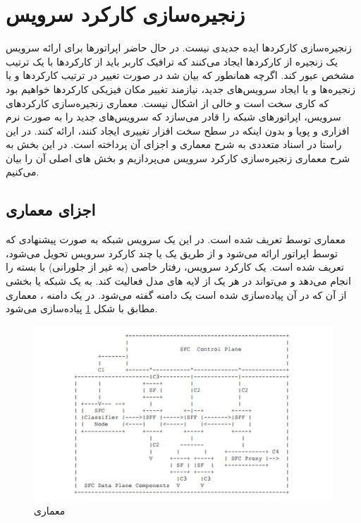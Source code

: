 \section{زنجیره‌سازی کارکرد سرویس}

زنجیره‌سازی کارکردها ایده جدیدی نیست.
در حال حاضر اپراتورها برای ارائه سرویس یک زنجیره از کارکردها ایجاد می‌کنند که ترافیک کاربر باید از کارکردها با یک ترتیب مشخص عبور کند.
اگرچه همانطور که بیان شد در صورت تغییر در ترتیب کارکردها و یا زنجیره‌ها و یا ایجاد سرویس‌های جدید، نیازمند تغییر مکان فیزیکی کارکردها خواهیم بود
که کاری سخت است و خالی از اشکال نیست.
معماری زنجیره‌سازی کارکردهای سرویس، اپراتورهای شبکه را قادر می‌سازد که سرویس‌های جدید را به صورت نرم افزاری و پویا و بدون اینکه در سطح سخت افزار تغییری ایجاد کنند، ارائه کنند.
در این راستا  در اسناد متعددی به شرح معماری و اجزای آن پرداخته است.
در این بخش به شرح معماری زنجیره‌سازی کارکرد سرویس می‌پردازیم و بخش های اصلی آن را بیان می‌کنیم.

\subsection{اجزای معماری }

معماری  توسط  تعریف شده است.
در این  یک سرویس شبکه به صورت پیشنهادی که توسط اپراتور ارائه می‌شود و
از طریق یک یا چند کارکرد سرویس تحویل می‌شود،
تعریف شده است.
یک کارکرد سرویس، رفتار خاصی (به غیر از جلورانی) با بسته را انجام می‌دهد
و می‌تواند در هر یک از لایه های مدل  فعالیت کند.
به یک شبکه یا بخشی از آن که در آن   پیاده‌سازی شده است یک دامنه  گفته می‌شود.
در یک دامنه ، معماری  مطابق با شکل \ref{fig.22} پیاده‌سازی می‌شود.

\begin{figure}[h!]
\center\includegraphics[scale=.5]{images/sfc}
\caption{معماری }
\label{fig.22}
\end{figure}

